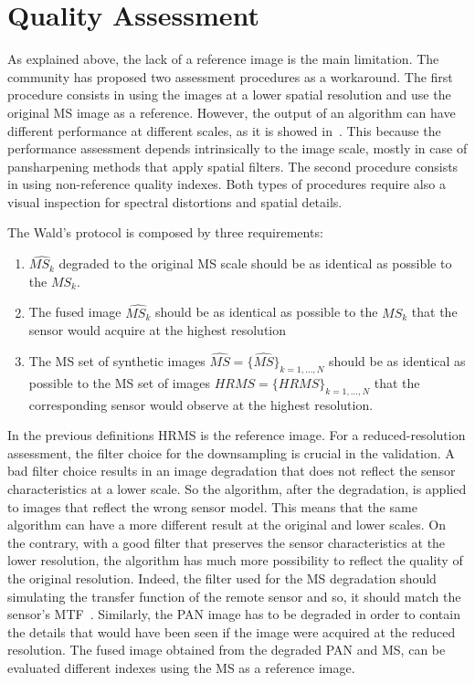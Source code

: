 \documentclass[12pt]{report}
\begin{document}
\section{Quality Assessment}
As explained above, the lack of a reference image is the main limitation. The community has proposed two assessment
procedures as a workaround. The first procedure consists in using the images at a lower spatial 
resolution and use the original MS image as a reference. However, the output of an algorithm can have 
different performance at different scales, as it is showed in~\cite{perfdiffscale}.
This because the performance assessment depends intrinsically to the image scale, 
mostly in case of pansharpening methods that apply spatial filters.
The second procedure consists in using non-reference quality indexes. 
Both types of procedures require also a visual inspection for spectral distortions and spatial details.

The Wald's protocol is composed by three requirements:
\begin{enumerate}
	\item $\widehat{MS_k}$ degraded to the original MS scale should be as identical as possible to the $MS_k$.
    \item The fused image $\widehat{MS_k}$ should be as identical as possible to the $MS_k$ that the sensor would acquire at the highest resolution
    \item The MS set of synthetic images $\widehat{MS} = {\{\widehat{MS}\}_{k=1,\dots,N}}$ should be as identical as possible
    to the MS set of images $HRMS = \{HRMS\}_{k=1,\dots,N}$ that the corresponding sensor would observe at the highest resolution.
\end{enumerate}

In the previous definitions HRMS is the reference image.
For a reduced-resolution assessment, the filter choice for the downsampling is crucial in the validation. 
A bad filter choice results in an image degradation that does not reflect the 
sensor characteristics at a lower scale. So the algorithm, after the degradation, is applied to
images that reflect the wrong sensor model. This means that the same algorithm can have a more different result at the original and lower scales. On the contrary, with a good filter that preserves the sensor characteristics at the lower resolution, the algorithm has much more possibility to reflect the quality of the original resolution.
Indeed, the filter used for the MS degradation should simulating the transfer function of the remote sensor and so, it should match the sensor's MTF~\cite{mtfsensor}. 
Similarly, the PAN image has to be degraded in order to contain the details that would have been seen if the image were acquired at the reduced resolution.
The fused image obtained from the degraded PAN and MS, can be evaluated different indexes using the MS as a reference image.
\end{document}
